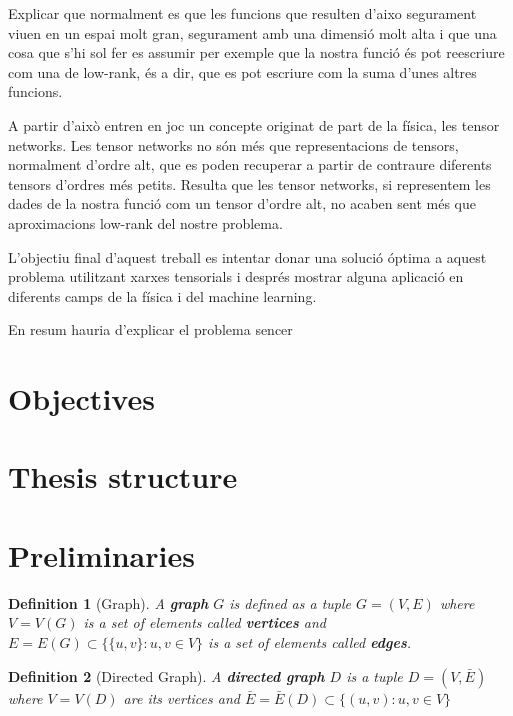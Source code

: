 \documentclass[11pt,a4paper,openright,oneside]{book}
\numberwithin{equation}{section}
\newtheorem{defn0}{Definition}[chapter]
\newenvironment{definition}{ \begin{defn0}}{\end{defn0}}
\begin{document}
Explicar que normalment es que les funcions que resulten d'aixo segurament viuen en un espai molt gran, segurament
amb una dimensió molt alta i que una cosa
que s'hi sol fer es assumir per exemple que la nostra funció és pot reescriure com una de low-rank, és a dir, que es pot escriure com la suma
d'unes altres funcions.

A partir d'això entren en joc un concepte originat de part de la física, les tensor networks. Les tensor networks no són més
que representacions de tensors, normalment d'ordre alt, que es poden recuperar a partir de contraure diferents tensors d'ordres més
petits. Resulta que les tensor networks, si representem les dades de la nostra funció com un tensor d'ordre alt, no acaben sent més que
aproximacions low-rank del nostre problema.

L'objectiu final d'aquest treball es intentar donar una solució óptima a aquest problema utilitzant xarxes tensorials i després mostrar
alguna aplicació en diferents camps de la física i del machine learning.

En resum hauria d'explicar el problema sencer

\section{Objectives}

\section{Thesis structure}

\section{Preliminaries}


\begin{definition}[Graph]
    A \textbf{graph} $G$ is defined as a tuple $G = (V,E)$ where $V = V(G)$ is a set of elements called \textbf{vertices} and 
    $E = E(G) \subset \{\{u, v\} : u, v \in V\}$ is a set of elements called \textbf{edges}.
\end{definition}

\begin{definition}[Directed Graph]
    A \textbf{directed graph} $D$ is a tuple $D = (V, \bar{E})$ where $V = V(D)$ are its vertices and
    $\bar{E} = \bar{E}(D) \subset \{(u,v) : u,v \in V\}$
\end{definition}
\end{document}
